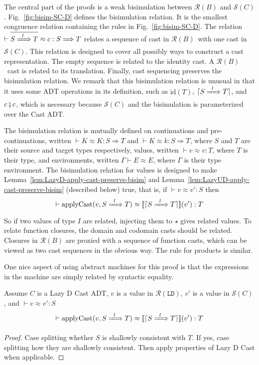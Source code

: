 \documentclass[runningheads]{llncs}
\newcommand{\RMachine}[1]{\ensuremath{\mathcal{R}(#1)}}
\newcommand{\LDMachine}{\RMachine{\BLD}}
\newcommand{\RBMachine}[0]{\RMachine{B}}
\newcommand{\SMachine}[1]{\ensuremath{\mathcal{S}(#1)}}
\newcommand{\Tdyn}[0]{\ensuremath{\star}}
\newcommand{\ccast}[3]{#1 \xRightarrow[]{\enskip #2 \enskip} #3}
\newcommand{\BLD}[0]{\ensuremath{\mathtt{LD}}}
\newcommand{\denote}[1]{\ensuremath{\llbracket #1 \rrbracket}}
\newcommand{\applyCast}[2]{\ensuremath{\mathrm{applyCast}(#1,#2)}}
\newcommand{\compose}[2]{\ensuremath{#1 \fatsemi #2}}
\newcommand{\translate}[1]{\ensuremath{\lceil#1\rceil}}
\newcommand{\id}[1]{\ensuremath{\mathrm{id}(#1)}}
\newcommand{\valuetyping}[2]{\ensuremath{\vdash #1 : #2}}
\newcommand{\casttyping}[3]{\ensuremath{\vdash #1 : #2 \Longrightarrow #3}}
\newcommand{\bisimE}[3]{\ensuremath{#1 \vdash #2 \approx #3}}
\newcommand{\bisimv}[3]{\valuetyping{#1 \approx #2}{#3}}
\newcommand{\bisimr}[3]{\valuetyping{#1 \approx #2}{#3}}
\newcommand{\bisimc}[4]{\casttyping{#1 \approx #2}{#3}{#4}}
\newcommand{\bisimK}[4]{\casttyping{#1 \approx #2}{#3}{#4}}
\begin{document}


The central part of the proofs is a weak bisimulation between \RMachine{B} and \SMachine{C}.
Fig.~\ref{fig:bisim-SC-D} defines the bisimulation relation.
It is the smallest congruence relation containing the rules 
in Fig.~\ref{fig:bisim-SC-D}.
%
The relation $\bisimc{\overline{\ccast{S}{l}{T}}}{c}{S}{T}$ relates a sequence 
of cast in \RBMachine\ with one cast in \SMachine{C}. This relation is designed 
to cover all possibly ways to construct a cast representation. The empty 
sequence is related to the identity cast. A \RBMachine\ cast is related 
to its translation. Finally, cast sequencing preserves the bisimulation 
relation.
%
We remark that this bisimulation relation is unusual in that it uses
some ADT operations in its definition, such as $\id{T}$, 
$\translate{\ccast{S}{l}{T}}$, and $\compose{c}{c}$, which is necessary because 
\SMachine{C} and the bisimulation is parameterized over the Cast ADT.

The bisimulation relation is mutually defined on continuations and pre-continuations,
written 
$\bisimK{K}{K}{S}{T}$ and $\bisimK{K}{k}{S}{T}$, where $S$ and $T$ are their 
source and target types respectively, values, written $\bisimv{v}{v}{T}$, 
where $T$ is their type, and environments, written $\bisimE{\Gamma}{E}{E}$, 
where $\Gamma$ is their type environment. The bisimulation relation for values 
is designed to make Lemma~\ref{lem:LazyD-apply-cast-preserve-bisim} and 
Lemma~\ref{lem:LazyUD-apply-cast-preserve-bisim} (described below) true, that 
is, if $\bisimv{v}{v'}{S}$
then
\[
\bisimr{
	\applyCast{v}{\ccast{S}{l}{T}}
}{
	\denote{\translate{\ccast{S}{l}{T}}}(v')
}{T}
\]
So if two values of type $I$ are related, injecting them to $\Tdyn$
gives related values.
%
To relate function closures, the domain and codomain casts should be related. 
Closures in \RMachine{B} are proxied with a sequence of function casts, which 
can be viewed as two cast sequences in the obvious way.
%
The rule for products is similar.

One nice aspect of using abstract machines for this proof is that
the expressions in the machine are simply related by syntactic equality.

\begin{lemma}[Lazy D $\denote{c}(v)$ Preserves Bisimulation]
	\label{lem:LazyD-apply-cast-preserve-bisim}
	Assume $C$ is a Lazy D Cast ADT,
	$v$ is a value in \LDMachine,
	$v'$ is a value in \SMachine{C},
	and $\bisimv{v}{v'}{S}$
	\[
	\bisimr{
		\applyCast{v}{\ccast{S}{l}{T}}
	}{
		\denote{\translate{\ccast{S}{l}{T}}}(v')
	}{T}
	\]
\end{lemma}
\begin{proof}
	Case splitting whether $S$ is shallowly consistent with $T$.
	If yes, case splitting how they are shallowly consistent.
	Then apply properties of Lazy D Cast when applicable.
\end{proof}
\end{document}
